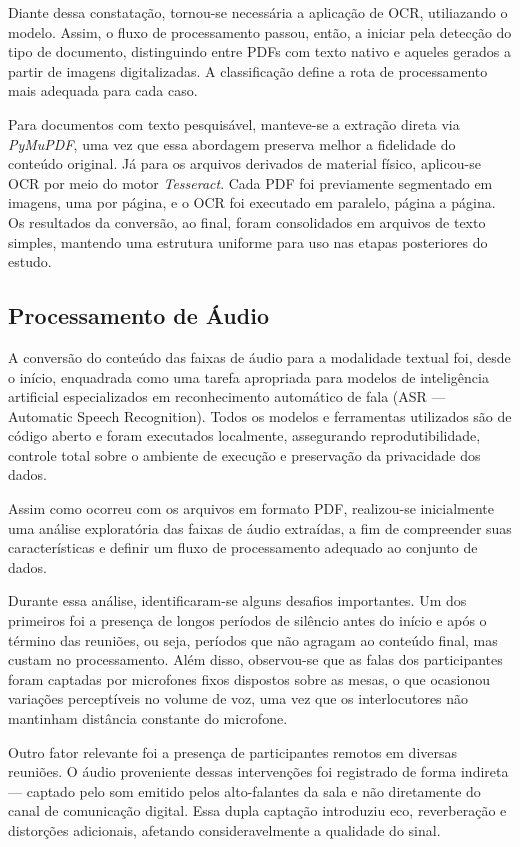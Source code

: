 Diante dessa constatação, tornou-se necessária a aplicação de OCR, utiliazando o modelo. Assim, o fluxo de processamento passou, então, a iniciar pela detecção do tipo de documento, distinguindo entre PDFs com texto nativo e aqueles gerados a partir de imagens digitalizadas. A classificação define a rota de processamento mais adequada para cada caso.

Para documentos com texto pesquisável, manteve-se a extração direta via \textit{PyMuPDF}, uma vez que essa abordagem preserva melhor a fidelidade do conteúdo original. Já para os arquivos derivados de material físico, aplicou-se OCR por meio do motor \textit{Tesseract}. Cada PDF foi previamente segmentado em imagens, uma por página, e o OCR foi executado em paralelo, página a página. Os resultados da conversão, ao final, foram consolidados em arquivos de texto simples, mantendo uma estrutura uniforme para uso nas etapas posteriores do estudo.

\subsection{Processamento de Áudio}
\label{sec:processamento-audio}

A conversão do conteúdo das faixas de áudio para a modalidade textual foi, desde o início, enquadrada como uma tarefa apropriada para modelos de inteligência artificial especializados em reconhecimento automático de fala (ASR — Automatic Speech Recognition). Todos os modelos e ferramentas utilizados são de código aberto e foram executados localmente, assegurando reprodutibilidade, controle total sobre o ambiente de execução e preservação da privacidade dos dados.

Assim como ocorreu com os arquivos em formato PDF, realizou-se inicialmente uma análise exploratória das faixas de áudio extraídas, a fim de compreender suas características e definir um fluxo de processamento adequado ao conjunto de dados.

Durante essa análise, identificaram-se alguns desafios importantes. Um dos primeiros foi a presença de longos períodos de silêncio antes do início e após o término das reuniões, ou seja, períodos que não agragam ao conteúdo final, mas custam no processamento. Além disso, observou-se que as falas dos participantes foram captadas por microfones fixos dispostos sobre as mesas, o que ocasionou variações perceptíveis no volume de voz, uma vez que os interlocutores não mantinham distância constante do microfone.

Outro fator relevante foi a presença de participantes remotos em diversas reuniões. O áudio proveniente dessas intervenções foi registrado de forma indireta — captado pelo som emitido pelos alto-falantes da sala e não diretamente do canal de comunicação digital. Essa dupla captação introduziu eco, reverberação e distorções adicionais, afetando consideravelmente a qualidade do sinal.

